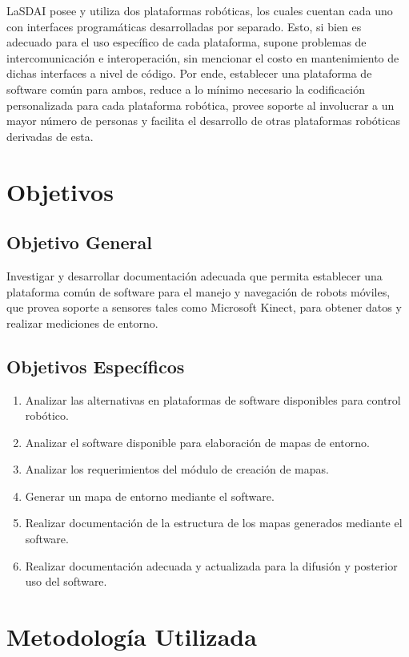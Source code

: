 LaSDAI posee y utiliza dos plataformas robóticas, los cuales cuentan cada uno con interfaces programáticas desarrolladas por separado. Esto, si bien es adecuado para el uso específico de cada plataforma, supone problemas de intercomunicación e interoperación, sin mencionar el costo en mantenimiento de dichas interfaces a nivel de código. Por ende, establecer una plataforma de software común para ambos, reduce a lo mínimo necesario la codificación personalizada para cada plataforma robótica, provee soporte al involucrar a un mayor número de personas y facilita el desarrollo de otras plataformas robóticas derivadas de esta.

\section{Objetivos}

\subsection{Objetivo General}

Investigar y desarrollar documentación adecuada que permita establecer una plataforma común de software para el manejo y navegación de robots móviles, que provea soporte a sensores tales como Microsoft Kinect, para obtener datos y realizar mediciones de entorno.

\subsection{Objetivos Específicos}

\begin{enumerate}
	\itemsep1pt \parskip1pt 
	\item Analizar las alternativas en plataformas de software disponibles para control robótico.
	\item Analizar el software disponible para elaboración de mapas de entorno.
	\item Analizar los requerimientos del módulo de creación de mapas.
	\item Generar un mapa de entorno mediante el software.
	\item Realizar documentación de la estructura de los mapas generados mediante el software.
	\item Realizar documentación adecuada y actualizada para la difusión y posterior uso del software.
\end{enumerate}

\section{Metodología Utilizada}


